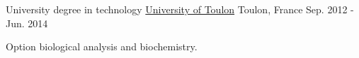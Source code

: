\begin{cventries}
  \cventry
    {University degree in technology} %
    {\href{http://www.univ-tln.fr/}{University of Toulon}} %
    {Toulon, France} %
    {Sep. 2012 - Jun. 2014} %
    {
      \begin{cvitems} %
        \item {Option biological analysis and biochemistry.}
      \end{cvitems}
    }

\end{cventries}
